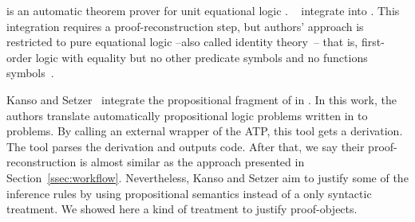 \documentclass[../main.tex]{subfiles}
\begin{document}


 is an automatic theorem prover for unit
equational logic \cite{hillenbrand1997}.
\citeauthor{foster2011integrating}~\cite{foster2011integrating}
integrate  into \Agda
\cite{agdateam}. This integration requires a proof-reconstruction
step, but authors' approach is restricted to pure equational logic
--also called identity theory~\cite{humberstone2011}-- that is,
first-order logic with equality but no other predicate symbols and
no functions symbols~\cite{appel1959}.

Kanso and Setzer~\cite{kanso2016light} integrate the propositional fragment of  in \Agda. In this work, the authors translate automatically propositional logic problems written in \Agda to \TPTP problems. By calling an external wrapper of the ATP, this tool gets a \TSTP derivation. The tool parses the  derivation and outputs
\Agda code. After that, we say their proof-reconstruction is almost
similar as the approach presented in Section~\ref{ssec:workflow}.
Nevertheless, Kanso and Setzer aim to justify some of the inference rules
by using propositional semantics instead of a only syntactic treatment. We showed here a kind of treatment to justify \Metis proof-objects.
\end{document}
